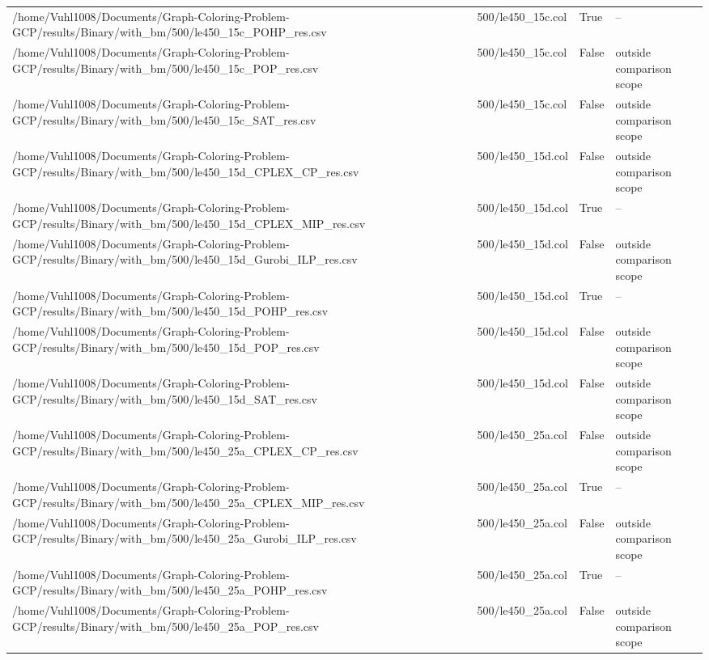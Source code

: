\begin{table}[htbp]
\begin{tabular}{llll}
/home/Vuhl1008/Documents/Graph-Coloring-Problem-GCP/results/Binary/with\_bm/500/le450\_15c\_POHP\_res.csv & 500/le450\_15c.col & True & -- \\
/home/Vuhl1008/Documents/Graph-Coloring-Problem-GCP/results/Binary/with\_bm/500/le450\_15c\_POP\_res.csv & 500/le450\_15c.col & False & outside comparison scope \\
/home/Vuhl1008/Documents/Graph-Coloring-Problem-GCP/results/Binary/with\_bm/500/le450\_15c\_SAT\_res.csv & 500/le450\_15c.col & False & outside comparison scope \\
/home/Vuhl1008/Documents/Graph-Coloring-Problem-GCP/results/Binary/with\_bm/500/le450\_15d\_CPLEX\_CP\_res.csv & 500/le450\_15d.col & False & outside comparison scope \\
/home/Vuhl1008/Documents/Graph-Coloring-Problem-GCP/results/Binary/with\_bm/500/le450\_15d\_CPLEX\_MIP\_res.csv & 500/le450\_15d.col & True & -- \\
/home/Vuhl1008/Documents/Graph-Coloring-Problem-GCP/results/Binary/with\_bm/500/le450\_15d\_Gurobi\_ILP\_res.csv & 500/le450\_15d.col & False & outside comparison scope \\
/home/Vuhl1008/Documents/Graph-Coloring-Problem-GCP/results/Binary/with\_bm/500/le450\_15d\_POHP\_res.csv & 500/le450\_15d.col & True & -- \\
/home/Vuhl1008/Documents/Graph-Coloring-Problem-GCP/results/Binary/with\_bm/500/le450\_15d\_POP\_res.csv & 500/le450\_15d.col & False & outside comparison scope \\
/home/Vuhl1008/Documents/Graph-Coloring-Problem-GCP/results/Binary/with\_bm/500/le450\_15d\_SAT\_res.csv & 500/le450\_15d.col & False & outside comparison scope \\
/home/Vuhl1008/Documents/Graph-Coloring-Problem-GCP/results/Binary/with\_bm/500/le450\_25a\_CPLEX\_CP\_res.csv & 500/le450\_25a.col & False & outside comparison scope \\
/home/Vuhl1008/Documents/Graph-Coloring-Problem-GCP/results/Binary/with\_bm/500/le450\_25a\_CPLEX\_MIP\_res.csv & 500/le450\_25a.col & True & -- \\
/home/Vuhl1008/Documents/Graph-Coloring-Problem-GCP/results/Binary/with\_bm/500/le450\_25a\_Gurobi\_ILP\_res.csv & 500/le450\_25a.col & False & outside comparison scope \\
/home/Vuhl1008/Documents/Graph-Coloring-Problem-GCP/results/Binary/with\_bm/500/le450\_25a\_POHP\_res.csv & 500/le450\_25a.col & True & -- \\
/home/Vuhl1008/Documents/Graph-Coloring-Problem-GCP/results/Binary/with\_bm/500/le450\_25a\_POP\_res.csv & 500/le450\_25a.col & False & outside comparison scope \\

\end{tabular}
\end{table}
